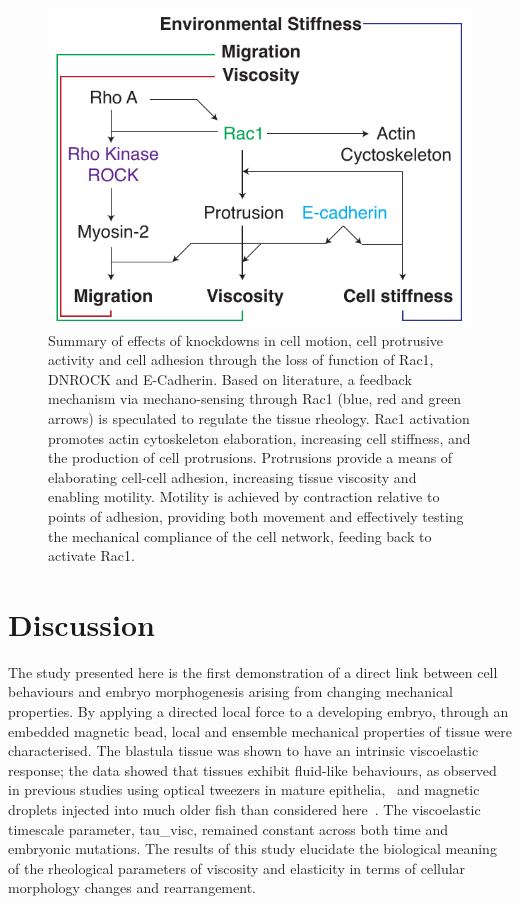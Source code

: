 \begin{figure}
 \centering
 \includegraphics{Chapters/tweezers/Figs/PDF/interconnected_protein_signalling}
 \caption{Summary of effects of knockdowns in cell motion, cell protrusive activity and cell adhesion through the loss of function of \gls{Rac1}, \gls{DNROCK} and E-Cadherin.
 Based on literature, a feedback mechanism via mechano-sensing through \gls{Rac1} (blue, red and green arrows) is speculated to regulate the tissue rheology.
 \gls{Rac1} activation promotes actin cytoskeleton elaboration, increasing cell stiffness, and the production of cell protrusions.
 Protrusions provide a means of elaborating cell-cell adhesion, increasing tissue viscosity and enabling motility.
 Motility is achieved by contraction relative to points of adhesion, providing both movement and effectively testing the mechanical compliance of the cell network, feeding back to activate \gls{Rac1}.
 }
 \label{fig:interconnected_protein_signalling}
\end{figure}

\section{Discussion}

The study presented here is the first demonstration of a direct link between cell behaviours and embryo morphogenesis arising from changing mechanical properties.
By applying a directed local force to a developing embryo, through an embedded magnetic bead, local and ensemble mechanical properties of tissue were characterised.
The blastula tissue was shown to have an intrinsic viscoelastic response;
the data showed that tissues exhibit fluid-like behaviours, as observed in previous studies using optical tweezers in mature epithelia,~\cite{} and magnetic droplets injected into much older fish than considered here~\cite{}.
The viscoelastic timescale parameter, \gls{tau_visc}, remained constant across both time and embryonic mutations.
The results of this study elucidate the biological meaning of the rheological parameters of viscosity and elasticity in terms of cellular morphology changes and rearrangement.

